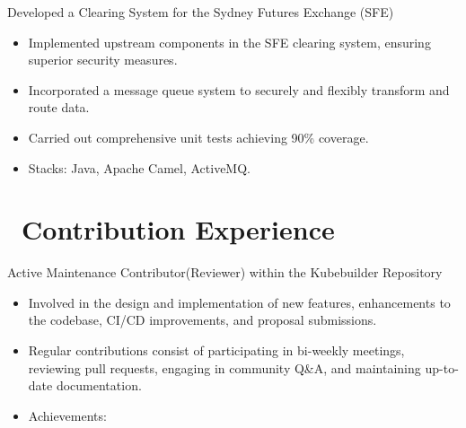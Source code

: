 \documentclass{resume}
\begin{document}
Developed a Clearing System for the Sydney Futures Exchange (SFE)
\begin{itemize}
  \item Implemented upstream components in the SFE clearing system, ensuring superior security measures.
  \item Incorporated a message queue system to securely and flexibly transform and route data.
  \item Carried out comprehensive unit tests achieving 90\% coverage.
  \item Stacks: Java, Apache Camel, ActiveMQ.
\end{itemize}

\section{\faUsers\ Contribution Experience}

Active Maintenance Contributor(Reviewer) within the Kubebuilder Repository
\begin{itemize}
  \item Involved in the design and implementation of new features, enhancements to the codebase, CI/CD improvements, and proposal submissions.
  \item Regular contributions consist of participating in bi-weekly meetings, reviewing pull requests, engaging in community Q\&A, and maintaining up-to-date documentation.
  \item Achievements:
     \textperiodcentered\
     \textperiodcentered\
     \textperiodcentered\
\end{itemize}

\end{document}
